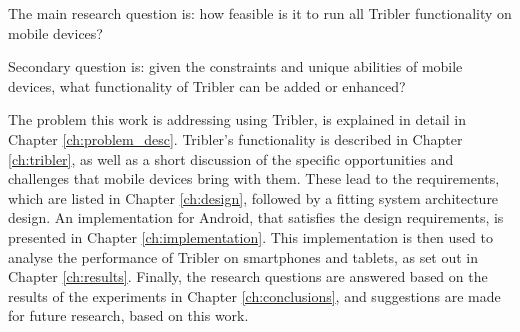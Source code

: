 
The main research question is: how feasible is it to run all Tribler functionality on mobile devices? %

Secondary question is: given the constraints and unique abilities of mobile devices, what functionality of Tribler can be added or enhanced?






The problem this work is addressing using Tribler, is explained in detail in Chapter \ref{ch:problem_desc}.
Tribler's functionality is described in Chapter \ref{ch:tribler}, as well as a short discussion of the specific opportunities and challenges that mobile devices bring with them.
These lead to the requirements, which are listed in Chapter \ref{ch:design}, followed by a fitting system architecture design.
An implementation for Android, that satisfies the design requirements, is presented in Chapter \ref{ch:implementation}.
This implementation is then used to analyse the performance of Tribler on smartphones and tablets, as set out in Chapter \ref{ch:results}.
Finally, the research questions are answered based on the results of the experiments in Chapter \ref{ch:conclusions}, and suggestions are made for future research, based on this work.

